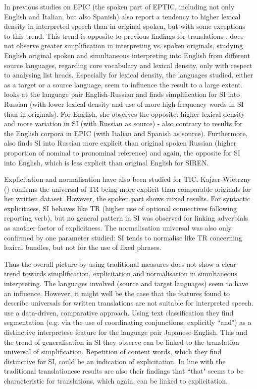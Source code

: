 \documentclass[output=paper,colorlinks,citecolor=brown]{langscibook}
\begin{document}
In previous studies on EPIC (the spoken part of EPTIC, including not only English and Italian, but also Spanish) \citet{Russo2012} also report a tendency to higher lexical density in interpreted speech than in original spoken, but with some exceptions to this trend. This trend is opposite to previous findings for translations \citep{Laviosa1998}. \citet{KajzerWietrzny2012} does not observe greater simplification in interpreting vs. spoken originals, studying English original spoken and simultaneous interpreting into English from different source languages, regarding core vocabulary and lexical density, only with respect to analysing list heads. Especially for lexical density, the languages studied, either as a target or a source language, seem to influence the result to a large extent. \citet{Dayter2018} looks at the language pair English-Russian and finds simplification for SI into Russian (with lower lexical density and use of more high frequency words in SI than in originals). For English, she observes the opposite: higher lexical density and more variation in SI (with Russian as source) - also contrary to results for the English corpora in EPIC (with Italian and Spanish as source). Furthermore, \citet{Dayter2018} also finds SI into Russian more explicit than original spoken Russian (higher proportion of nominal to pronominal reference) and again, the opposite for SI into English, which is less explicit than original English for SIREN.

Explicitation and normalisation have also been studied for TIC. Kajzer-Wie\-trzny (\citeyear*{KajzerWietrzny2012}) confirms the universal of TR being more explicit than comparable originals for her written dataset. However, the spoken part shows mixed results. For syntactic explicitness, SI behaves like TR (higher use of optional connectives following reporting verb), but no general pattern in SI was observed for linking adverbials as another factor of explicitness. The normalisation universal was also only confirmed by one parameter studied: SI tends to normalise like TR concerning lexical bundles, but not for the use of fixed phrases.

Thus the overall picture by using traditional measures does not show a clear trend towards simplification, explicitation and normalisation in simultaneous interpreting. The languages involved (source and target languages) seem to have an influence. However, it might well be the case that the features found to describe universals for written translations are not suitable for interpreted speech. \citet{HeEtAl2016} use a data-driven, comparative approach. Using text classification they find segmentation (e.g. via the use of coordinating conjunctions, explicitly “and") as a distinctive interpretese feature for the language pair Japanese-English. This and the trend of generalisation in SI they observe can be linked to the translation universal of simplification. Repetition of content words, which they find distinctive for SI, could be an indication of explicitation. In line with the traditional translationese results are also their findings that “that" seems to be characteristic for translations, which again, can be linked to explicitation.
\end{document}
